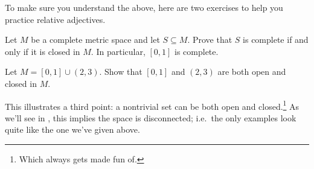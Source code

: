 To make sure you understand the above,
here are two exercises to help you practice relative adjectives.

\begin{exercise}
	Let $M$ be a complete metric space and let $S \subseteq M$.
	Prove that $S$ is complete if and only if it is closed in $M$.
	In particular, $[0,1]$ is complete.
\end{exercise}
\begin{exercise}
	Let $M = [0,1] \cup (2,3)$.
	Show that $[0,1]$ and $(2,3)$ are both open and closed in $M$.
\end{exercise}

This illustrates a third point:
a nontrivial set can be both open and closed.\footnote{Which
	always gets made fun of.}
As we'll see in , this implies the space is disconnected;
i.e.\ the only examples look quite like the one we've given above.

